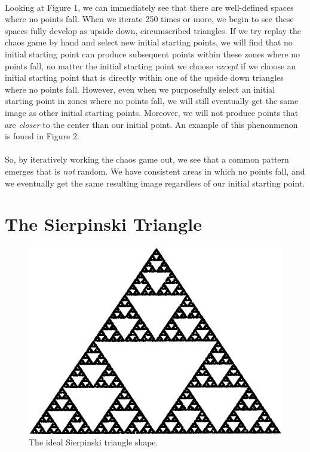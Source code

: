 \documentclass{article}
\begin{document}
\paragraph{}
Looking at Figure 1, we can immediately see that there are well-defined spaces where no points fall. When we iterate 250 times or more, we begin to see these spaces fully develop as upside down, circumscribed triangles. If we try replay the chaos game by hand and select new initial starting points, we will find that no initial starting point can produce subsequent points within these zones where no points fall, no matter the initial starting point we choose \textit{except} if we choose an initial starting point that is directly within one of the upside down triangles where no points fall. However, even when we purposefully select an initial starting point in zones where no points fall, we will still eventually get the same image as other initial starting points. Moreover, we will not produce points that are \textit{closer} to the center than our initial point. An example of this phenonmenon is found in Figure 2.
\paragraph{}
 So, by iteratively working the chaos game out, we see that a common pattern emerges that is \textit{not} random. We have consistent areas in which no points fall, and we eventually get the same resulting image regardless of our initial starting point.
\section*{The Sierpinski Triangle}
\begin{figure}[H]
    \centering
    \includegraphics[width=.5\linewidth, height=.25\textheight]{ideal}
    \caption{The ideal Sierpinski triangle shape.}
\end{figure}
\end{document}

